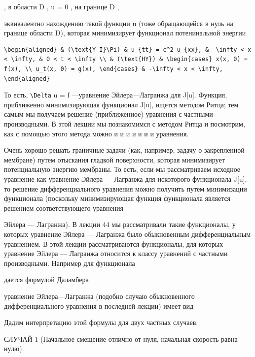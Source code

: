 \documentclass[
  ukrainian,
]{article}
\begin{document}
, в области D , u = 0 , на границе D ,

эквивалентно нахождению такой функции u (тоже обращающейся в нуль на
границе области D), которая минимизирует функционал потенинальной
энергии

\begin{verbatim}
\begin{aligned} & (\text{Y-I}\Pi) & u_{tt} = c^2 u_{xx}, & -\infty < x < \infty, & 0 < t < \infty \\ & (\text{HY}) & \begin{cases} x(x, 0) = f(x), \\ u_t(x, 0) = g(x), \end{cases} & -\infty < x < \infty, \end{aligned}
\end{verbatim}

То есть, \texttt{\textbackslash{}Delta} u = f ---уравнение
Эйлера---Лагранжа для J{[}u{]}. Функция, приближенно минимизирующая
функционал J{[}u{]}, ищется методом Ритца; тем самым мы получаем решение
(приближениое) уравнения с частными производными. В этой лекции мы
познакомимся с методом Ритца и посмотрим, как с помощью этого метода
можно и и и и и и и уравнения.

Очень хорошо решать граничные задачи (как, например, задачу о
закрепленной мембране) путем отыскания гладкой поверхности, которая
минимизирует потенциальную энергию мембраны. То есть, если мы
рассматриваем исходное уравнение как уравнение Эйлера --- Лагранжа для
искоторого функционала J{[}u{]}, то решение дифференциального уравнения
можно получить путем минимизации функционала (поскольку минимизирующая
функция функционала является решением соответствующего уравнения

Эйлера --- Лагранжа). В лекции 44 мы рассматривали такие функционалы, у
которых уравнение Эйлера --- Лагранжа было обыкновенным дифференциальным
уравнением. В этой лекции рассматриваются функционалы, для которых
уравнение Эйлера --- Лагранжа относится к классу уравнений с частными
производными. Например для функционала

дается формулой Даламбера

уравнение Эйлера---Лагранжа (подобно случаю обыкновенного
дифференциального уравнения в последней лекции) имеет вид

Дадим интерпретацию этой формулы для двух частных случаев.

СЛУЧАЙ 1 (Начальное смещение отлично от нуля, начальная скорость равна
нулю).
\end{document}
